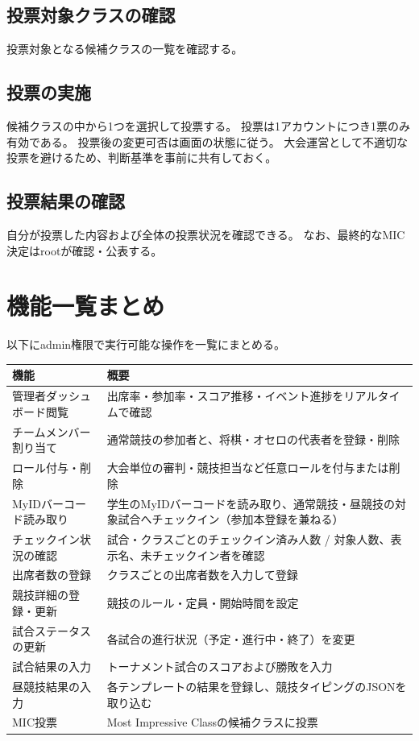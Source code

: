 \documentclass[12pt]{ltjsarticle}
\begin{document}
\subsection{投票対象クラスの確認}

投票対象となる候補クラスの一覧を確認する。

\subsection{投票の実施}

候補クラスの中から1つを選択して投票する。
投票は1アカウントにつき1票のみ有効である。
投票後の変更可否は画面の状態に従う。
大会運営として不適切な投票を避けるため、判断基準を事前に共有しておく。

\subsection{投票結果の確認}

自分が投票した内容および全体の投票状況を確認できる。
なお、最終的なMIC決定はrootが確認・公表する。

\newpage

\section{機能一覧まとめ}

以下にadmin権限で実行可能な操作を一覧にまとめる。

\begin{longtable}{p{4.5cm}p{9cm}}
\toprule
\textbf{機能} & \textbf{概要} \\
\midrule
\endhead
管理者ダッシュボード閲覧 & 出席率・参加率・スコア推移・イベント進捗をリアルタイムで確認 \\
\midrule
チームメンバー割り当て & 通常競技の参加者と、将棋・オセロの代表者を登録・削除 \\
\midrule
ロール付与・削除 & 大会単位の審判・競技担当など任意ロールを付与または削除 \\
\midrule
MyIDバーコード読み取り & 学生のMyIDバーコードを読み取り、通常競技・昼競技の対象試合へチェックイン（参加本登録を兼ねる） \\
\midrule
チェックイン状況の確認 & 試合・クラスごとのチェックイン済み人数 / 対象人数、表示名、未チェックイン者を確認 \\
\midrule
出席者数の登録 & クラスごとの出席者数を入力して登録 \\
\midrule
競技詳細の登録・更新 & 競技のルール・定員・開始時間を設定 \\
\midrule
試合ステータスの更新 & 各試合の進行状況（予定・進行中・終了）を変更 \\
\midrule
試合結果の入力 & トーナメント試合のスコアおよび勝敗を入力 \\
\midrule
昼競技結果の入力 & 各テンプレートの結果を登録し、競技タイピングのJSONを取り込む \\
\midrule
MIC投票 & Most Impressive Classの候補クラスに投票 \\
\bottomrule
\end{longtable}
\end{document}
